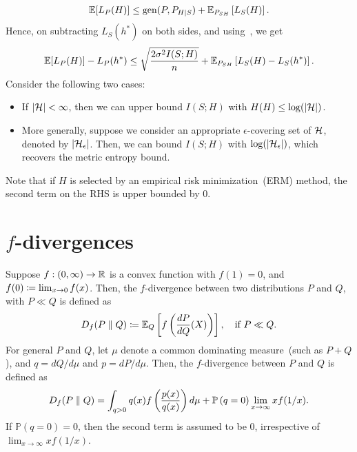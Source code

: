             \begin{align}
                \mathbb{E}[L_P(H)] \leq \text{gen}(P, P_{H|S}) + \mathbb{E}_{P_{SH}} \left[ L_S(H) \right]. 
            \end{align}
            Hence, on subtracting $L_S(h^*)$ on both sides, and using~, we get 
            \begin{align}
                \mathbb{E}[L_P(H)] - L_P(h^*) \leq \sqrt{\frac{2 \sigma^2 I(S; H)}{n}} + \mathbb{E}_{P_{SH}} \left[ L_S(H) - L_S(h^*)\right]. 
            \end{align}
            Consider the following two cases: 
            \begin{itemize}
                \item If $|\mathcal{H}|<\infty$, then we can upper bound $I(S; H)$ with $H(H) \leq \log(|\mathcal{H}|)$. 
                \item More generally, suppose we consider an appropriate $\epsilon$-covering set of $\mathcal{H}$, denoted by $|\mathcal{H}_{\epsilon}|$. Then, we can bound $I(S; H)$ with $\log(|\mathcal{H}_{\epsilon}|)$, which recovers the metric entropy bound. 
            \end{itemize}
            Note that if $H$ is selected by an empirical risk minimization~(ERM) method, the second term on the RHS is upper bounded by $0$. 
            
            
            


            
    \section{$f$-divergences}
        \begin{definition}
            \label{def:f-divergence} Suppose $f:(0, \infty) \to \mathbb{R}$ is a convex function with $f(1)=0$, and $f(0) \coloneqq \lim_{x\to 0} f(x)$. Then, the $f$-divergence between two distributions $P$ and $Q$, with $P\ll Q$ is defined as 
            \begin{align}
                D_f(P\parallel Q) \coloneqq 
                    \mathbb{E}_{Q} \left[ f\left( \frac{dP}{dQ}(X) \right) \right], \quad \text{if } P \ll Q. 
            \end{align}
            For general $P$ and $Q$, let $\mu$ denote a common dominating measure~(such as $P+Q$), and $q = dQ/d\mu$ and $p = dP/d\mu$. Then, the $f$-divergence between $P$ and $Q$ is defined as 
            \begin{align}
                D_f(P \parallel Q) = \int_{q>0} q(x) f\left( \frac{p(x)}{q(x)} \right) d\mu + \mathbb{P}\left( q=0\right) \lim_{x \to \infty} x f(1/x).
            \end{align}
            If $\mathbb{P}(q=0)=0$, then the second term is assumed to be $0$, irrespective of $\lim_{x \to \infty}xf(1/x)$. 
        \end{definition}

